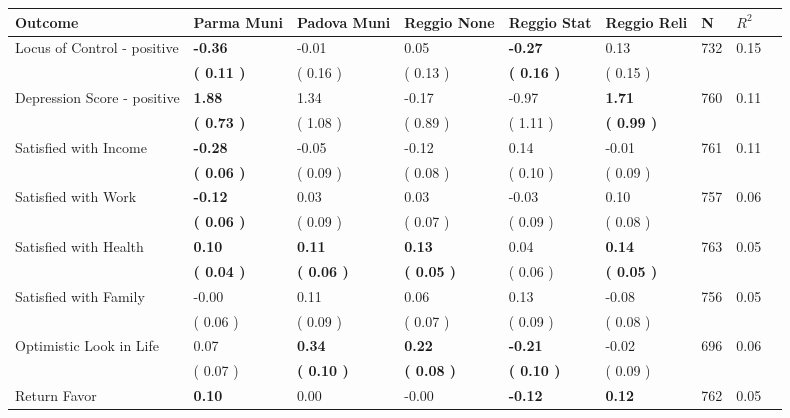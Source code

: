 \begin{tabular}{L{6.2cm} C{1.8cm} C{1.8cm} C{1.8cm} C{1.8cm} C{1.8cm} C{1.8cm} C{0.3cm} C{0.3cm}}
\toprule
 \textbf{Outcome} & \textbf{Parma Muni} & \textbf{Padova Muni} & \textbf{Reggio None} & \textbf{Reggio Stat} & \textbf{Reggio Reli} & \textbf{N} & \textbf{$ R^2$} \\
\midrule
Locus of Control - positive & \textbf{    -0.36} &     -0.01 &      0.05 & \textbf{    -0.27} &      0.13  & 732 &       0.15 \\ 
 & \textbf{(     0.11 )} & (     0.16 ) & (     0.13 ) & \textbf{(     0.16 )} & (     0.15 )  & \\
Depression Score - positive & \textbf{     1.88} &      1.34 &     -0.17 &     -0.97 & \textbf{     1.71}  & 760 &       0.11 \\ 
 & \textbf{(     0.73 )} & (     1.08 ) & (     0.89 ) & (     1.11 ) & \textbf{(     0.99 )}  & \\
Satisfied with Income & \textbf{    -0.28} &     -0.05 &     -0.12 &      0.14 &     -0.01  & 761 &       0.11 \\ 
 & \textbf{(     0.06 )} & (     0.09 ) & (     0.08 ) & (     0.10 ) & (     0.09 )  & \\
Satisfied with Work & \textbf{    -0.12} &      0.03 &      0.03 &     -0.03 &      0.10  & 757 &       0.06 \\ 
 & \textbf{(     0.06 )} & (     0.09 ) & (     0.07 ) & (     0.09 ) & (     0.08 )  & \\
Satisfied with Health & \textbf{     0.10} & \textbf{     0.11} & \textbf{     0.13} &      0.04 & \textbf{     0.14}  & 763 &       0.05 \\ 
 & \textbf{(     0.04 )} & \textbf{(     0.06 )} & \textbf{(     0.05 )} & (     0.06 ) & \textbf{(     0.05 )}  & \\
Satisfied with Family &     -0.00 &      0.11 &      0.06 &      0.13 &     -0.08  & 756 &       0.05 \\ 
 & (     0.06 ) & (     0.09 ) & (     0.07 ) & (     0.09 ) & (     0.08 )  & \\
Optimistic Look in Life &      0.07 & \textbf{     0.34} & \textbf{     0.22} & \textbf{    -0.21} &     -0.02  & 696 &       0.06 \\ 
 & (     0.07 ) & \textbf{(     0.10 )} & \textbf{(     0.08 )} & \textbf{(     0.10 )} & (     0.09 )  & \\
Return Favor & \textbf{     0.10} &      0.00 &     -0.00 & \textbf{    -0.12} & \textbf{     0.12}  & 762 &       0.05 \\ 

\end{tabular}
